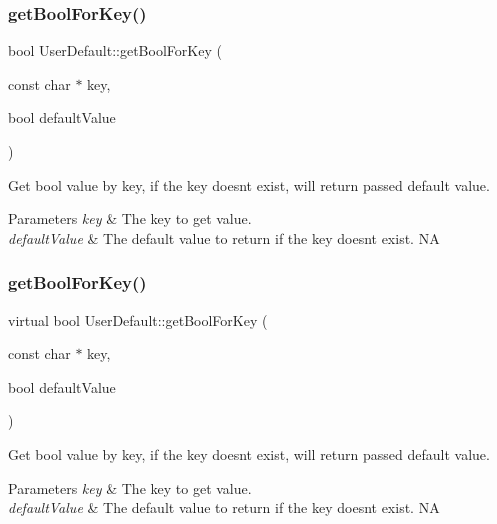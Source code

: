 \subsubsection{\texorpdfstring{get\+Bool\+For\+Key()}{getBoolForKey()}\hspace{0.1cm}{\footnotesize\ttfamily [3/4]}}
{\footnotesize\ttfamily bool User\+Default\+::get\+Bool\+For\+Key (\begin{DoxyParamCaption}\item[{const char $\ast$}]{key,  }\item[{bool}]{default\+Value }\end{DoxyParamCaption})\hspace{0.3cm}{\ttfamily [virtual]}}

Get bool value by key, if the key doesn\textquotesingle{}t exist, will return passed default value. 
\begin{DoxyParams}{Parameters}
{\em key} & The key to get value. \\
\hline
{\em default\+Value} & The default value to return if the key doesn\textquotesingle{}t exist.  NA \\
\hline
\end{DoxyParams}
\mbox{\label{classUserDefault_a62f8a93f34043a909e73720ea0d292a5}} 
\subsubsection{\texorpdfstring{get\+Bool\+For\+Key()}{getBoolForKey()}\hspace{0.1cm}{\footnotesize\ttfamily [4/4]}}
{\footnotesize\ttfamily virtual bool User\+Default\+::get\+Bool\+For\+Key (\begin{DoxyParamCaption}\item[{const char $\ast$}]{key,  }\item[{bool}]{default\+Value }\end{DoxyParamCaption})\hspace{0.3cm}{\ttfamily [virtual]}}

Get bool value by key, if the key doesn\textquotesingle{}t exist, will return passed default value. 
\begin{DoxyParams}{Parameters}
{\em key} & The key to get value. \\
\hline
{\em default\+Value} & The default value to return if the key doesn\textquotesingle{}t exist.  NA \\
\hline
\end{DoxyParams}
\mbox{\label{classUserDefault_aa01598193b5ee7c6db0b53e02297d44d}} 
